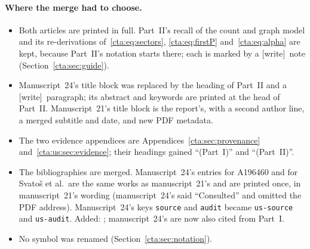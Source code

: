 \documentclass[11pt]{article}
\theoremstyle{definition}
\theoremstyle{remark}
\newcommand{\wtag}{\textup{[write]}}
\begin{document}
\paragraph{Where the merge had to choose.}
\begin{itemize}
\item Both articles are printed in full. Part~II's recall of the count and
graph model and its re-derivations of~\eqref{cta:eq:sectors},
\eqref{cta:eq:firstP} and~\eqref{cta:eq:alpha} are kept, because Part~II's
notation starts there; each is marked by a \wtag\ note
(Section~\ref{cta:sec:guide}).
\item Manuscript~24's title block was replaced by the heading of Part~II
and a \wtag\ paragraph; its abstract and keywords are printed at the head
of Part~II. Manuscript~21's title block is the report's, with a second
author line, a merged subtitle and date, and new PDF metadata.
\item The two evidence appendices are Appendices~\ref{cta:sec:provenance}
and~\ref{cta:us:sec:evidence}; their headings gained ``(Part~I)'' and
``(Part~II)''.
\item The bibliographies are merged. Manuscript~24's entries for A196460
and for Svato\v{s} et al.\ are the same works as manuscript~21's and are
printed once, in manuscript~21's wording (manuscript~24's said
``Consulted'' and omitted the PDF address). Manuscript~24's keys
\texttt{source} and \texttt{audit} became \texttt{us-source} and
\texttt{us-audit}. Added: \cite{smc,cti,tsvol,htpreview}; manuscript~24's
\cite{colored,connected} are now also cited from Part~I.
\item No symbol was renamed (Section~\ref{cta:sec:notation}).
\end{itemize}
\end{document}
